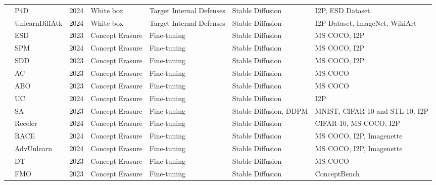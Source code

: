 \begin{table*}[htp]
{\begin{tabular}{p{}p{}p{}p{}p{}p{}p{}}
\cellcolor{white} & {P4D}\cite{chin2023prompting4debugging} & 2024 & White box & Target Internal Defenses & Stable Diffusion & I2P, ESD Dataset \\
\cellcolor{white}\multirow{-14}{0.1\textwidth}{Jailbreak Attack} & {UnlearnDiffAtk}\cite{zhang2023generate} & 2024 & White box & Target Internal Defenses & Stable Diffusion & I2P Dataset, ImageNet, WikiArt \\
\hline
 
\cellcolor{white} & ESD\cite{gandikota2023erasing} & 2023 & Concept Erasure & Fine-tuning & Stable Diffusion & MS COCO, I2P \\ 
\cellcolor{white} & SPM\cite{lyu2024one} & 2024 & Concept Erasure & Fine-tuning & Stable Diffusion & MS COCO, I2P \\ 
\cellcolor{white} & SDD\cite{kim2023towards} & 2023 & Concept Erasure  & Fine-tuning & Stable Diffusion & MS COCO, I2P \\ 
\cellcolor{white} & AC\cite{kumari2023ablating} & 2023 & Concept Erasure & Fine-tuning & Stable Diffusion & MS COCO \\ 
\cellcolor{white} & ABO\cite{hong2024all} & 2023 & Concept Erasure & Fine-tuning & Stable Diffusion & MS COCO \\ 
\cellcolor{white} & UC\cite{wu2024unlearning} & 2024 & Concept Erasure & Fine-tuning & Stable Diffusion & I2P \\ 
\cellcolor{white} & SA\cite{heng2024selective} & 2023 & Concept Erasure & Fine-tuning & Stable Diffusion, DDPM & MNIST, CIFAR-10 and STL-10, I2P\\ 
\cellcolor{white} & Receler\cite{huang2023receler} & 2024 & Concept Erasure & Fine-tuning & Stable Diffusion & CIFAR-10, MS COCO, I2P \\ 
\cellcolor{white} & RACE\cite{kim2024race} & 2024 & Concept Erasure & Fine-tuning & Stable Diffusion & MS COCO, I2P, Imagenette\\ 
\cellcolor{white} & AdvUnlearn\cite{zhang2024defensive} & 2024 & Concept Erasure & Fine-tuning & Stable Diffusion & MS COCO, I2P, Imagenette \\ 
\cellcolor{white} & DT\cite{ni2023degeneration} & 2023 & Concept Erasure & Fine-tuning & Stable Diffusion & MS COCO \\ 
\cellcolor{white} & FMO\cite{zhang2024forget} & 2023 & Concept Erasure & Fine-tuning & Stable Diffusion & ConceptBench \\

\end{tabular}}
\end{table*}
